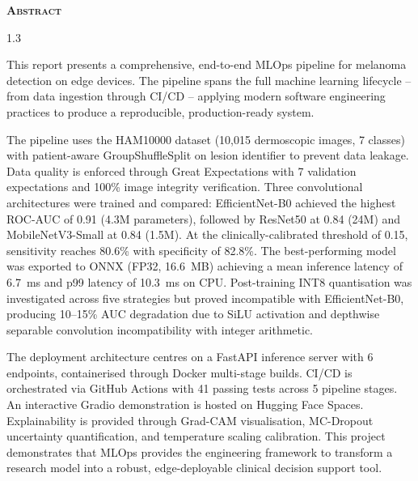 \begin{center}
\vspace*{3cm}
\textsc{\huge \bfseries Abstract}\\[1cm]
\end{center}

\begin{spacing}{1.3}

This report presents a comprehensive, end-to-end MLOps pipeline for melanoma detection on edge devices. The pipeline spans the full machine learning lifecycle -- from data ingestion through CI/CD -- applying modern software engineering practices to produce a reproducible, production-ready system.

The pipeline uses the HAM10000 dataset (10,015 dermoscopic images, 7 classes) with patient-aware GroupShuffleSplit on lesion identifier to prevent data leakage. Data quality is enforced through Great Expectations with 7 validation expectations and 100\% image integrity verification. Three convolutional architectures were trained and compared: EfficientNet-B0 achieved the highest ROC-AUC of 0.91 (4.3M parameters), followed by ResNet50 at 0.84 (24M) and MobileNetV3-Small at 0.84 (1.5M). At the clinically-calibrated threshold of 0.15, sensitivity reaches 80.6\% with specificity of 82.8\%. The best-performing model was exported to ONNX (FP32, 16.6~MB) achieving a mean inference latency of 6.7~ms and p99 latency of 10.3~ms on CPU. Post-training INT8 quantisation was investigated across five strategies but proved incompatible with EfficientNet-B0, producing 10--15\% AUC degradation due to SiLU activation and depthwise separable convolution incompatibility with integer arithmetic.

The deployment architecture centres on a FastAPI inference server with 6 endpoints, containerised through Docker multi-stage builds. CI/CD is orchestrated via GitHub Actions with 41 passing tests across 5 pipeline stages. An interactive Gradio demonstration is hosted on Hugging Face Spaces. Explainability is provided through Grad-CAM visualisation, MC-Dropout uncertainty quantification, and temperature scaling calibration. This project demonstrates that MLOps provides the engineering framework to transform a research model into a robust, edge-deployable clinical decision support tool.

\end{spacing}
